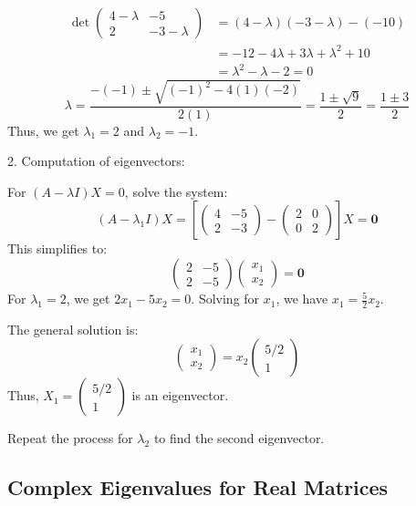 \begin{align*}
    \det \begin{pmatrix}
        4 - \lambda & -5 \\
        2 & -3 - \lambda
        \end{pmatrix} &= (4-\lambda)(-3-\lambda) - (-10) \\
        &= -12 - 4\lambda + 3\lambda + \lambda^2 + 10 \\
        &= \lambda^2 - \lambda - 2 = 0
\end{align*}
\[
\lambda = \frac{-(-1) \pm \sqrt{(-1)^2 - 4(1)(-2)}}{2(1)} = \frac{1 \pm \sqrt{9}}{2} = \frac{1 \pm 3}{2}
\]
Thus, we get \(\lambda_1 = 2\) and \(\lambda_2 = -1\).

2. Computation of eigenvectors: \newline

For \((A - \lambda I)X = 0\), solve the system:
\[ (A - \lambda_1 I)X = \left[\begin{pmatrix} 4 & -5 \\ 2 & -3 \end{pmatrix} - \begin{pmatrix} 2 & 0 \\ 0 & 2 \end{pmatrix}\right] X = \mathbf{0} \]
This simplifies to:
\[
\begin{pmatrix}
2 & -5 \\
2 & -5
\end{pmatrix} \begin{pmatrix}
x_1 \\
x_2
\end{pmatrix} = \mathbf{0}
\]
For \(\lambda_1 = 2\), we get \(2x_1 - 5x_2 = 0\). Solving for \(x_1\), we have \(x_1 = \frac{5}{2} x_2\).

The general solution is:
\[
\begin{pmatrix}
x_1 \\
x_2
\end{pmatrix} = x_2 \begin{pmatrix}
5/2 \\
1
\end{pmatrix}
\]
Thus, \(X_1 = \begin{pmatrix}
5/2 \\
1
\end{pmatrix}\) is an eigenvector.

Repeat the process for \(\lambda_2\) to find the second eigenvector.
\subsection{Complex Eigenvalues for Real Matrices}

